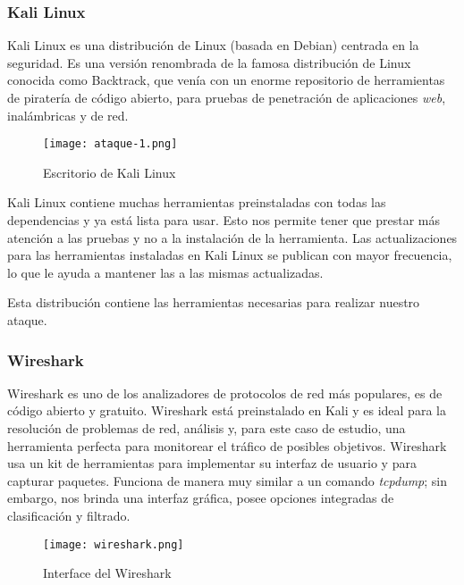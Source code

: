 
\subsubsection*{Kali Linux}
Kali Linux es una distribución de Linux (basada en Debian) centrada en la seguridad. 
Es una versión renombrada de la famosa distribución de Linux conocida como Backtrack, 
que venía con un enorme repositorio de herramientas de piratería de código abierto, 
para pruebas de penetración de aplicaciones \emph{web}, inalámbricas y de red. 

\begin{center}
    \begin{figure}   
       \begin{center}
          \texttt{[image: ataque-1.png]}
       \end{center}
       \caption{Escritorio de Kali Linux}
    \end{figure}
 \end{center}
 

Kali Linux contiene muchas herramientas preinstaladas con 
todas las dependencias y ya está lista para usar. Esto nos permite tener que prestar 
más atención a las pruebas y no a la instalación de la herramienta. Las actualizaciones 
para las herramientas instaladas en Kali Linux se publican con mayor frecuencia, 
lo que le ayuda a mantener las a las mismas actualizadas.

Esta distribución contiene las herramientas necesarias para realizar nuestro
ataque.

\subsubsection*{Wireshark}
Wireshark es uno de los analizadores de protocolos de red más populares, es de 
código abierto y gratuito. Wireshark está preinstalado en Kali y es ideal para la 
resolución de problemas de red, análisis y, para este caso de estudio, una herramienta 
perfecta para monitorear el tráfico de posibles objetivos. Wireshark usa un kit de 
herramientas para implementar su interfaz de usuario y para capturar paquetes. 
Funciona de manera muy similar a un comando \emph{tcpdump}; sin embargo, nos brinda
una interfaz gráfica, posee opciones integradas de clasificación y filtrado.

\begin{center}
    \begin{figure}   
       \begin{center}
          \texttt{[image: wireshark.png]}
       \end{center}
       \caption{Interface del Wireshark}
    \end{figure}
 \end{center}
 

